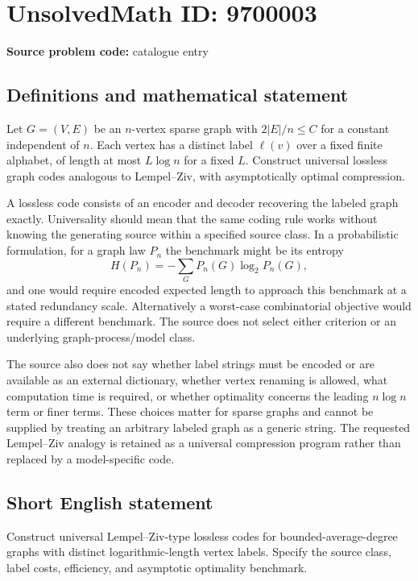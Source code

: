\documentclass[11pt]{article}
\begin{document}
\section*{UnsolvedMath ID: 9700003}
\textbf{Source problem code:} catalogue entry
\subsection{Definitions and mathematical statement}
Let $G=(V,E)$ be an $n$-vertex sparse graph with $2|E|/n\leq C$ for a constant independent of $n$. Each vertex has a distinct label $\ell(v)$ over a fixed finite alphabet, of length at most $L\log n$ for a fixed $L$. Construct universal lossless graph codes analogous to Lempel--Ziv, with asymptotically optimal compression.

A lossless code consists of an encoder and decoder recovering the labeled graph exactly. Universality should mean that the same coding rule works without knowing the generating source within a specified source class. In a probabilistic formulation, for a graph law $P_n$ the benchmark might be its entropy
\[
H(P_n)=-\sum_G P_n(G)\log_2 P_n(G),
\]
and one would require encoded expected length to approach this benchmark at a stated redundancy scale. Alternatively a worst-case combinatorial objective would require a different benchmark. The source does not select either criterion or an underlying graph-process/model class.

The source also does not say whether label strings must be encoded or are available as an external dictionary, whether vertex renaming is allowed, what computation time is required, or whether optimality concerns the leading $n\log n$ term or finer terms. These choices matter for sparse graphs and cannot be supplied by treating an arbitrary labeled graph as a generic string. The requested Lempel--Ziv analogy is retained as a universal compression program rather than replaced by a model-specific code.
\subsection{Short English statement}
Construct universal Lempel--Ziv-type lossless codes for bounded-average-degree graphs with distinct logarithmic-length vertex labels. Specify the source class, label costs, efficiency, and asymptotic optimality benchmark.
\end{document}
